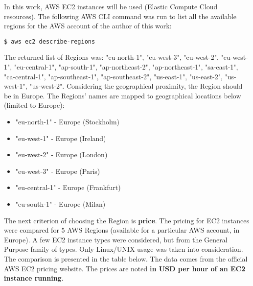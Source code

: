In this work, AWS EC2 instances will be used (Elastic Compute Cloud resources). The following AWS CLI command was run to list all the available regions for the AWS account of the author of this work:
\begin{lstlisting}[basicstyle=\small,caption={A command of AWS CLI tool used to list all the available regions (for an AWS account)}]
$ aws ec2 describe-regions
\end{lstlisting}

The returned list of Regions was: "eu-north-1", "eu-west-3", "eu-west-2", "eu-west-1", "eu-central-1", "ap-south-1", "ap-northeast-2", "ap-northeast-1", "sa-east-1", "ca-central-1", "ap-southeast-1", "ap-southeast-2", "us-east-1", "us-east-2", "us-west-1", "us-west-2". Considering the geographical proximity, the Region should be in Europe. The Regions' names are mapped to geographical locations below (limited to Europe)\cite{aws-region-map}:
\begin{itemize}
\item "eu-north-1" - Europe (Stockholm)
\item "eu-west-1" - Europe (Ireland)
\item "eu-west-2" - Europe (London)
\item "eu-west-3" - Europe (Paris)
\item "eu-central-1" - Europe (Frankfurt)
\item "eu-south-1" - Europe (Milan)
\end{itemize}

The next criterion of choosing the Region is \textbf{price}. The pricing for EC2 instances were compared for 5 AWS Regions (available for a particular AWS account, in Europe). A few EC2 instance types were considered, but from the General Purpose family of types. Only Linux/UNIX usage was taken into consideration. The comparison is presented in the table below. The data comes from the official AWS EC2 pricing website\cite{ec2-pricing}. The prices are noted \textbf{in USD per hour of an EC2 instance running}.

